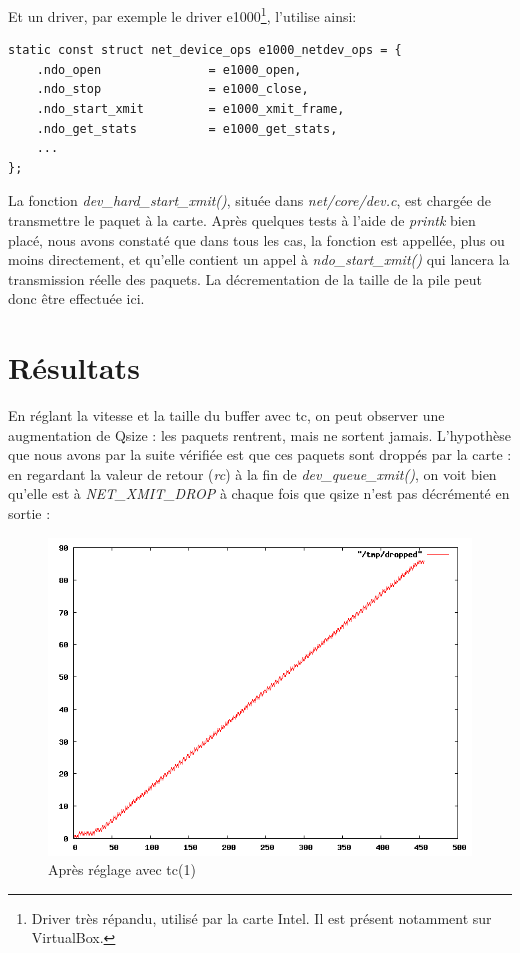 \documentclass[a4paper]{article}
\begin{document}
Et un driver, par exemple le driver e1000\footnote{Driver très répandu, utilisé par la carte Intel. Il est présent notamment sur VirtualBox.}, l'utilise ainsi:
\begin{verbatim}
static const struct net_device_ops e1000_netdev_ops = {
    .ndo_open               = e1000_open,
    .ndo_stop               = e1000_close,
    .ndo_start_xmit         = e1000_xmit_frame,
    .ndo_get_stats          = e1000_get_stats,
    ...
};
\end{verbatim}

La fonction \textit{dev\_hard\_start\_xmit()}, située dans
\textit{net/core/dev.c}, est chargée de transmettre le paquet
à la carte. Après quelques tests à l'aide de \textit{printk} bien
placé, nous avons constaté que dans tous les cas, la fonction
est appellée, plus ou moins directement, et qu'elle contient 
un appel à \textit{ndo\_start\_xmit()} qui lancera la transmission réelle des paquets. La décrementation de la
taille de la pile peut donc être effectuée ici.

\section{Résultats}
En réglant la vitesse et la taille du buffer avec tc, on peut observer
une augmentation de Qsize : les paquets rentrent, mais ne sortent jamais.
L'hypothèse que nous avons par la suite vérifiée est que ces paquets
sont droppés par la carte : en regardant la valeur de retour (\textit{rc}) à
la fin de \textit{dev\_queue\_xmit()}, on voit bien qu'elle est à
\textit{NET\_XMIT\_DROP} à chaque fois que qsize n'est pas décrémenté
en sortie :
\begin{figure}[!ht]
	\centering
	\includegraphics[scale=.5]{dropped.png}
	\caption{\label{dropped} Après réglage avec tc(1)}
\end{figure}
\end{document}
